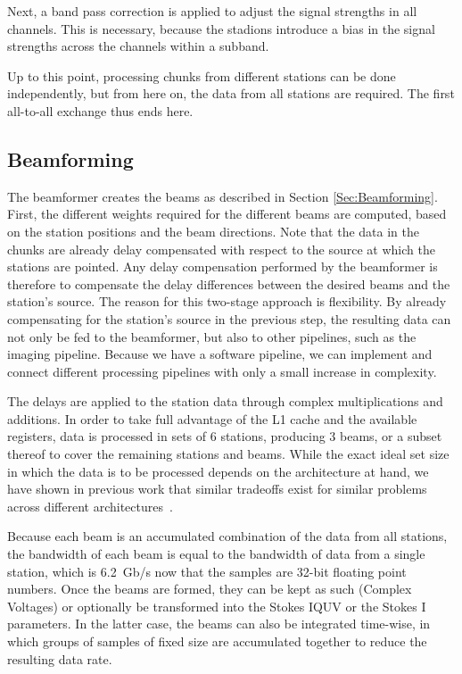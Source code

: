 \documentclass{llncs}
\begin{document}
Next, a band pass correction is applied to adjust the signal strengths in all channels. This is necessary, because the stadions introduce a bias in the signal strengths across the channels within a subband.

Up to this point, processing chunks from different stations can be done independently, but from here on, the data from all stations are required. The first all-to-all exchange thus ends here.

\subsection{Beamforming}

The beamformer creates the beams as described in Section \ref{Sec:Beamforming}. First, the different weights required for the different beams are computed, based on the station positions and the beam directions. Note that the data in the chunks are already delay compensated with respect to the source at which the stations are pointed. Any delay compensation performed by the beamformer is therefore to compensate the delay differences between the desired beams and the station's source. The reason for this two-stage approach is flexibility. By already compensating for the station's source in the previous step, the resulting data can not only be fed to the beamformer, but also to other pipelines, such as the imaging pipeline. Because we have a software pipeline, we can implement and connect different processing pipelines with only a small increase in complexity.

The delays are applied to the station data through complex multiplications and additions. In order to take full advantage of the L1 cache and the available registers, data is processed in sets of 6 stations, producing 3 beams, or a subset thereof to cover the remaining stations and beams. While the exact ideal set size in which the data is to be processed depends on the architecture at hand, we have shown in previous work that similar tradeoffs exist for similar problems across different architectures~\cite{FOO,BAR}.

Because each beam is an accumulated combination of the data from all stations, the bandwidth of each beam is equal to the bandwidth of data from a single station, which is 6.2~Gb/s now that the samples are 32-bit floating point numbers. Once the beams are formed, they can be kept as such (Complex Voltages) or optionally be transformed into the Stokes IQUV or the Stokes I parameters. In the latter case, the beams can also be integrated time-wise, in which groups of samples of fixed size are accumulated together to reduce the resulting data rate.
\end{document}
